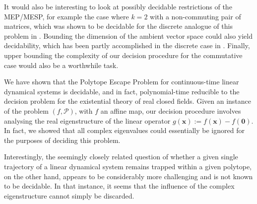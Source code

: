 It would also be interesting to look at possibly decidable
restrictions of the MEP/MESP, for example the case where $k=2$ with a
non-commuting pair of matrices, which was shown to be decidable for
the discrete analogue of this problem in \cite{MEHTP}. Bounding the dimension of the ambient vector space could also yield decidability, which has been partly accomplished in the discrete case in \cite{CK05}. Finally, upper bounding the complexity of our decision procedure for the commutative case would also be a worthwhile task.

We have shown that the Polytope Escape Problem for continuous-time
linear dynamical systems is decidable, and in fact, polynomial-time
reducible to the decision problem for the existential theory of real
closed fields.  Given an instance of the problem $(f,\mathcal{P})$,
with $f$ an affine map, our decision procedure involves analysing the real
eigenstructure of the linear operator
$g(\boldsymbol{x}):=f(\boldsymbol{x})-f(\boldsymbol{0})$. In fact, we
showed that all complex eigenvalues could essentially be ignored for
the purposes of deciding this problem.

Interestingly, the seemingly closely related question of whether a
given single trajectory of a linear dynamical system remains trapped
within a given polytope, on the other hand, appears to be
considerably more challenging and is not known to be decidable. In
that instance, it seems that the influence of the complex
eigenstructure cannot simply be discarded.
